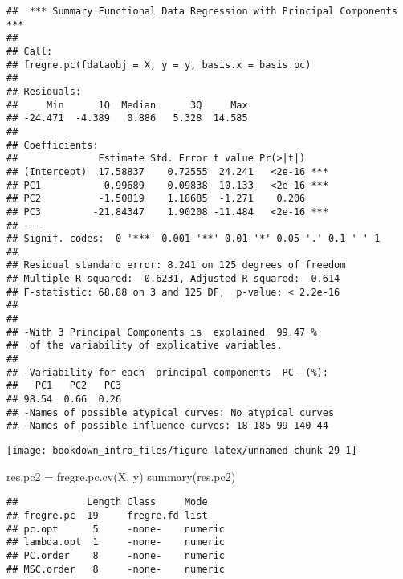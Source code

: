 \documentclass[
]{book}
\newenvironment{Shaded}{\begin{snugshade}}{\end{snugshade}}
\newcommand{\AttributeTok}[1]{\textcolor[rgb]{0.77,0.63,0.00}{#1}}
\newcommand{\DecValTok}[1]{\textcolor[rgb]{0.00,0.00,0.81}{#1}}
\newcommand{\FunctionTok}[1]{\textcolor[rgb]{0.00,0.00,0.00}{#1}}
\newcommand{\NormalTok}[1]{#1}
\newcommand{\OtherTok}[1]{\textcolor[rgb]{0.56,0.35,0.01}{#1}}
\newcommand{\SpecialCharTok}[1]{\textcolor[rgb]{0.00,0.00,0.00}{#1}}
\begin{document}
\begin{verbatim}
##  *** Summary Functional Data Regression with Principal Components ***
## 
## Call:
## fregre.pc(fdataobj = X, y = y, basis.x = basis.pc)
## 
## Residuals:
##     Min      1Q  Median      3Q     Max 
## -24.471  -4.389   0.886   5.328  14.585 
## 
## Coefficients:
##              Estimate Std. Error t value Pr(>|t|)    
## (Intercept)  17.58837    0.72555  24.241   <2e-16 ***
## PC1           0.99689    0.09838  10.133   <2e-16 ***
## PC2          -1.50819    1.18685  -1.271    0.206    
## PC3         -21.84347    1.90208 -11.484   <2e-16 ***
## ---
## Signif. codes:  0 '***' 0.001 '**' 0.01 '*' 0.05 '.' 0.1 ' ' 1
## 
## Residual standard error: 8.241 on 125 degrees of freedom
## Multiple R-squared:  0.6231, Adjusted R-squared:  0.614 
## F-statistic: 68.88 on 3 and 125 DF,  p-value: < 2.2e-16
## 
## 
## -With 3 Principal Components is  explained  99.47 %
##  of the variability of explicative variables. 
## 
## -Variability for each  principal components -PC- (%):
##   PC1   PC2   PC3 
## 98.54  0.66  0.26 
## -Names of possible atypical curves: No atypical curves 
## -Names of possible influence curves: 18 185 99 140 44
\end{verbatim}

\begin{center}\texttt{[image: bookdown\_intro\_files/figure-latex/unnamed-chunk-29-1]} \end{center}

\begin{Shaded}
\begin{Highlighting}[]
\NormalTok{res.pc2 }\OtherTok{=} \FunctionTok{fregre.pc.cv}\NormalTok{(X, y)}
\FunctionTok{summary}\NormalTok{(res.pc2)}
\end{Highlighting}
\end{Shaded}

\begin{verbatim}
##            Length Class     Mode   
## fregre.pc  19     fregre.fd list   
## pc.opt      5     -none-    numeric
## lambda.opt  1     -none-    numeric
## PC.order    8     -none-    numeric
## MSC.order   8     -none-    numeric
\end{verbatim}

\begin{Shaded}
\end{Shaded}
\end{document}
